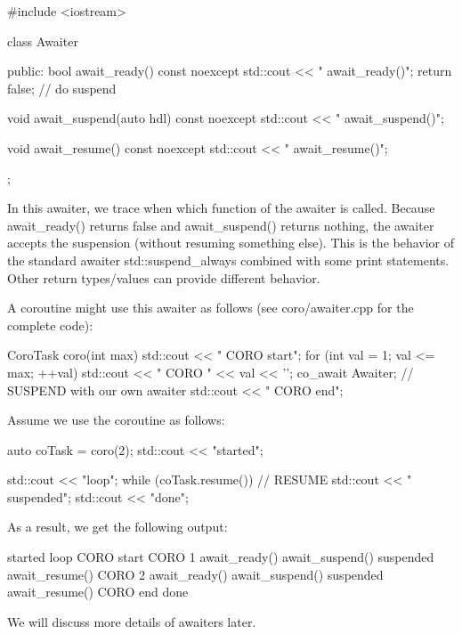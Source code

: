
\begin{cpp}
#include <iostream>

class Awaiter {
	public:
	bool await_ready() const noexcept {
		std::cout << " await_ready()\n";
		return false; // do suspend
	}
	
	void await_suspend(auto hdl) const noexcept {
		std::cout << " await_suspend()\n";
	}
	
	void await_resume() const noexcept {
		std::cout << " await_resume()\n";
	}
};
\end{cpp}

In this awaiter, we trace when which function of the awaiter is called. Because await\_ready() returns false and await\_suspend() returns nothing, the awaiter accepts the suspension (without resuming something else). This is the behavior of the standard awaiter std::suspend\_always{} combined with some print statements. Other return types/values can provide different behavior.

A coroutine might use this awaiter as follows (see coro/awaiter.cpp for the complete code):

\begin{cpp}
CoroTask coro(int max)
{
	std::cout << "   CORO start\n";
	for (int val = 1; val <= max; ++val) {
		std::cout << "   CORO " << val << '\n';
		co_await Awaiter{}; // SUSPEND with our own awaiter
	}
	std::cout << "   CORO end\n";
}
\end{cpp}

Assume we use the coroutine as follows:

\begin{cpp}
auto coTask = coro(2);
std::cout << "started\n";

std::cout << "loop\n";
while (coTask.resume()) { // RESUME
	std::cout << " suspended\n";
}
std::cout << "done\n";
\end{cpp}

As a result, we get the following output:

\begin{shell}
started
loop
  CORO start
  CORO 1
    await_ready()
    await_suspend()
  suspended
    await_resume()
  CORO 2
    await_ready()
    await_suspend()
  suspended
    await_resume()
  CORO end
done
\end{shell}

We will discuss more details of awaiters later.


